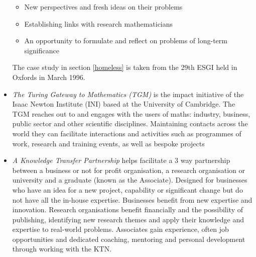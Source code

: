 \documentclass[11pt]{article} %
\begin{document}
\begin{itemize}
\begin{itemize}
			\item New perspectives and fresh ideas on their problems
			\item Establishing links with research mathematicians
			\item An opportunity to formulate and reflect on problems  of long-term significance
		\end{itemize}	
		The case study in section \ref{homeless} is taken from the 29th ESGI held in Oxfords in March 1996. 
		\item \textit{The Turing Gateway to Mathematics (TGM)} is the impact initiative of the Isaac Newton Institute (INI) based at the University of Cambridge. The TGM reaches out to and engages with the users of maths: industry, business, public sector and other scientific disciplines. Maintaining contacts across the world they can facilitate interactions and activities such as programmes of work, research and training events, as well as bespoke projects
		\item  \textit{A Knowledge Transfer Partnership} helps facilitate a 3 way partnership between a business or not for profit organisation, a research organisation or university and a graduate (known as the Associate). Designed for businesses who have an idea for a new project, capability or significant change but  do not have all the in-house expertise. Businesses benefit from new expertise and innovation. Research organisations benefit financially and  the possibility of publishing, identifying new research themes and apply their knowledge and expertise to real-world problems. Associates gain experience, often job opportunities and dedicated coaching, mentoring and personal development through working with the KTN.
		 
		
	
	\end{itemize}
\end{document}
